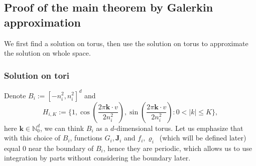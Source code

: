 \documentclass[a4paper, 11pt]{article}
\theoremstyle{plain}
\theoremstyle{remark}
\theoremstyle{definition}
\newcommand{\intr}{\int_{B_R(0)}}
\newcommand{\J}{\boldsymbol{J}}
\begin{document}
		\subsection{Proof of the main theorem by Galerkin approximation}
        We first find a solution on torus, then use the solution on torus to approximate the solution on whole space.
        \subsubsection{Solution on tori}
		\renewcommand{\intr}{\int_{B_i}}
		Denote $B_i:=[-n_i^2,n_i^2]^d$ and
		\begin{equation}
			H_{i,K}:=\Big\{1,\cos(\frac{2\pi \boldsymbol{k}\cdot v}{{2n_i^2}}),\sin(\frac{2\pi \boldsymbol{k}\cdot v}{{2n_i^2}}):0<|k|\leq K\Big\},
		\end{equation}
		here $\boldsymbol{k}\in\mathbb{N}_0^d$, we can think $B_i$ as a $d$-dimensional torus. Let us emphasize that with this choice of $B_i$, functions $G_i,\J_i$ and $f_i,\varrho_i$~(which will be defined later) equal $0$ near the boundary of $B_i$, hence they are periodic, which allows us to use integration by parts without considering the boundary later.
		
\end{document}
